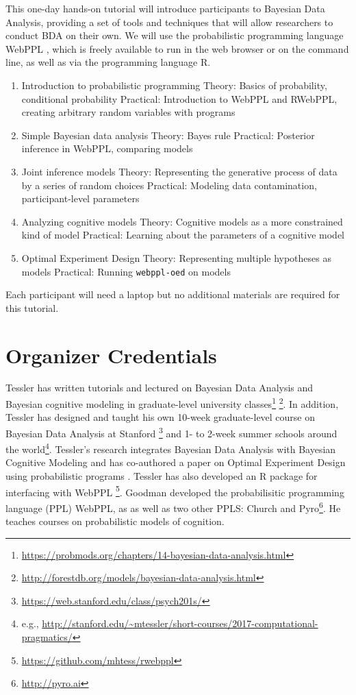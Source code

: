 \documentclass[10pt,letterpaper]{article}
\providecommand{\tightlist}{%
  \setlength{\itemsep}{0pt}\setlength{\parskip}{0pt}}
\begin{document}
This one-day hands-on tutorial will introduce participants to Bayesian Data Analysis, providing a set of tools and techniques that will allow researchers to conduct BDA on their own. 
We will use the probabilistic programming language WebPPL \cite{dippl}, which is freely available to run in the web browser or on the command line, as well as via the programming language R. 

\begin{enumerate}
\tightlist
\item Introduction to probabilistic programming
	\subitem Theory: Basics of probability, conditional probability
	\subitem Practical: Introduction to WebPPL and RWebPPL, creating arbitrary random variables with programs
\item Simple Bayesian data analysis
	\subitem Theory: Bayes rule 
	\subitem Practical: Posterior inference in WebPPL, comparing models
\item Joint inference models
	\subitem Theory: Representing the generative process of data by a series of random choices
	\subitem Practical: Modeling data contamination, participant-level parameters
\item Analyzing cognitive models
	\subitem Theory: Cognitive models as a more constrained kind of model
	\subitem Practical: Learning about the parameters of a cognitive model
\item Optimal Experiment Design
	\subitem Theory: Representing multiple hypotheses as models 
	\subitem Practical: Running \texttt{webppl-oed} on models
\end{enumerate}

Each participant will need a laptop but no additional materials are required for this tutorial. 

\section{Organizer Credentials}

Tessler has written tutorials and lectured on Bayesian Data Analysis and Bayesian cognitive modeling in graduate-level university classes\footnote{\url{https://probmods.org/chapters/14-bayesian-data-analysis.html}}
\footnote{\url{http://forestdb.org/models/bayesian-data-analysis.html}}.
In addition, Tessler has designed and taught his own 10-week graduate-level course on Bayesian Data Analysis at Stanford \footnote{
\url{https://web.stanford.edu/class/psych201s/}
} and 1- to 2-week summer schools around the world\footnote{
e.g., \url{http://stanford.edu/~mtessler/short-courses/2017-computational-pragmatics/}}.
Tessler's research integrates Bayesian Data Analysis with Bayesian Cognitive Modeling and has co-authored a paper on Optimal Experiment Design using probabilistic programs \cite{OuyangTLG16}.  
Tessler has also developed an R package for interfacing with WebPPL \footnote{\url{https://github.com/mhtess/rwebppl}}.
Goodman developed the probabilisitic programming language (PPL) WebPPL, as as well as two other PPLS: Church \cite{church} and Pyro\footnote{\url{http://pyro.ai}}.
He teaches courses on probabilistic models of cognition.




\setlength{\bibleftmargin}{.125in}
\setlength{\bibindent}{-\bibleftmargin}


\end{document}
